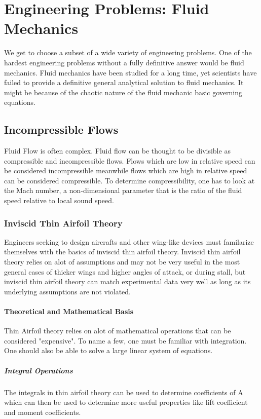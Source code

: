 \documentclass[a4paper, 12pt]{report}
\begin{document}
\part{Engineering Problems: Fluid Mechanics}
We get to choose a subset of a wide variety of engineering problems. One of the hardest engineering problems without a fully definitive answer would be fluid mechanics. Fluid mechanics have been studied for a long time, yet scientists have failed to provide a definitive general analytical solution to fluid mechanics. It might be because of the chaotic nature of the fluid mechanic basic governing equations.

\chapter{Incompressible Flows}
Fluid Flow is often complex. Fluid flow can be thought to be divisible as compressible and incompressible flows. Flows which are low in relative speed can be considered incompressible meanwhile flows which are high in relative speed can be considered compressible. To determine compressibility, one has to look at the Mach number, a non-dimensional parameter that is the ratio of the fluid speed relative to local sound speed.

\section{Inviscid Thin Airfoil Theory}
Engineers seeking to design aircrafts and other wing-like devices must familarize themselves with the basics of inviscid thin airfoil theory. Inviscid thin airfoil theory relies on alot of assumptions and may not be very useful in the most general cases of thicker wings and higher angles of attack, or during stall, but inviscid thin airfoil theory can match experimental data very well as long as its underlying assumptions are not violated.

\subsection{Theoretical and Mathematical Basis}
Thin Airfoil theory relies on alot of mathematical operations that can be considered "expensive". To name a few, one must be familiar with integration. One should also be able to solve a large linear system of equations.

\subsubsection{Integral Operations}
The integrals in thin airfoil theory can be used to determine coefficients of A which can then be used to determine more useful properties like lift coefficient and moment coefficients.
\end{document}
